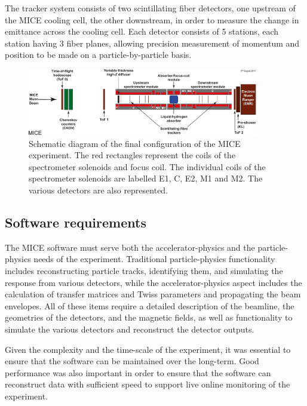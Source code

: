 \documentclass[11pt]{article}
\begin{document}
The tracker system consists of two scintillating fiber detectors, one upstream of the MICE cooling cell, the other downstream, in order to measure the change in emittance across the cooling cell. Each detector consists of 5 stations, each station having 3 fiber planes, allowing precision measurement of momentum and position to be made on a particle-by-particle basis.


\begin{figure}[!htb]
\centering
\includegraphics[width=0.9\textwidth]{figs/Step-4-labels.pdf}
\caption{ Schematic diagram of the final configuration of the MICE experiment. The red rectangles represent the coils of the spectrometer solenoids and focus coil. The individual coils of the spectrometer solenoids are labelled E1, C, E2, M1 and M2. The various detectors are also represented.}
\label{fig:step4}
\end{figure}


\subsection{Software requirements} \label{sec:requirements}

The MICE software must serve both the accelerator-physics and the particle-physics needs of the experiment. Traditional particle-physics functionality includes reconstructing particle tracks, identifying them, and simulating the response from various detectors, while the accelerator-physics aspect includes the calculation of transfer matrices and Twiss parameters and propagating the beam envelopes. All of these items require a detailed description of the beamline, the geometries of the detectors, and the magnetic fields, as well as functionality to simulate the various detectors and reconstruct the detector outputs. 

Given the complexity and the time-scale of the experiment, it was essential to ensure that the software can be maintained over the long-term. Good performance was also important in order to ensure that the software can reconstruct data with sufficient speed to support live online monitoring of the experiment.
\end{document}
